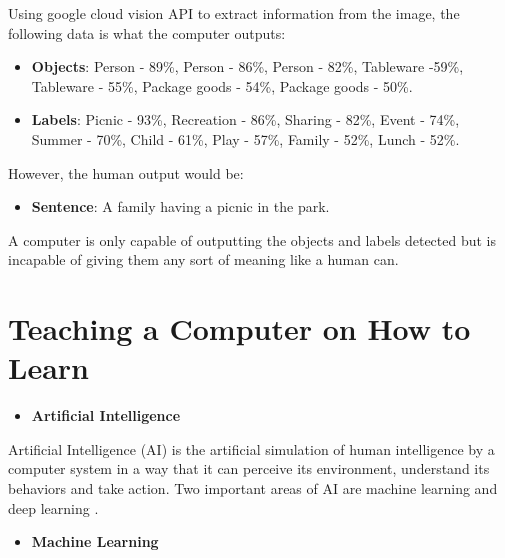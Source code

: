     Using google cloud vision API \cite{google} to extract information from the image, the following data is what the computer outputs:

    \begin{itemize}
        \item \textbf{Objects}: Person - 89\%, Person - 86\%, Person - 82\%, Tableware -59\%, Tableware - 55\%, Package goods - 54\%, Package goods - 50\%. 
        \item \textbf{Labels}: Picnic - 93\%, Recreation - 86\%, Sharing - 82\%, Event - 74\%, Summer - 70\%, Child - 61\%, Play - 57\%, Family - 52\%, Lunch - 52\%.
    \end{itemize}
   
   However, the human output would be: 
   
   \begin{itemize}
       \item \textbf{Sentence}: A family having a picnic in the park.
   \end{itemize}

     
    \par A computer is only capable of outputting the objects and labels detected but is incapable of giving them any sort of meaning like a human can.





    \section{Teaching a Computer on How to Learn}

    \begin{itemize}
        \item \textbf{ Artificial Intelligence }
    \end{itemize}

    Artificial Intelligence (AI) is the artificial simulation of human intelligence by a computer system in a way that it can perceive its environment, understand its behaviors and take action. Two important areas of AI are machine learning and deep learning \cite{mathworks_AI}.

    


    \begin{itemize}
        \item \textbf{Machine Learning}
    \end{itemize}
    

